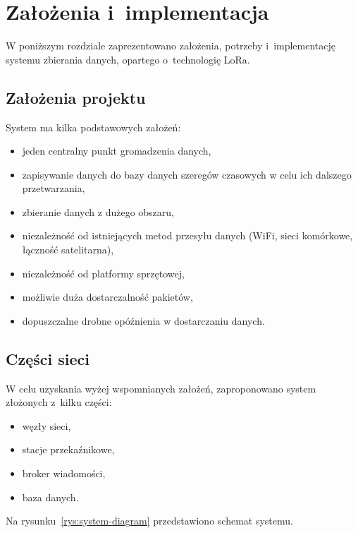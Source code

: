 \chapter{Założenia i~implementacja}
W poniższym rozdziale zaprezentowano założenia, potrzeby i~implementację systemu zbierania danych, opartego o~technologię LoRa.

\section{Założenia projektu}
System ma kilka podstawowych założeń:
\begin{itemize}
    \item jeden centralny punkt gromadzenia danych,
    \item zapisywanie danych do bazy danych szeregów czasowych w celu ich dalszego przetwarzania,
    \item zbieranie danych z dużego obszaru,
    \item niezależność od istniejących metod przesyłu danych (WiFi, sieci komórkowe, łączność satelitarna),
    \item niezależność od platformy sprzętowej,
    \item możliwie duża dostarczalność pakietów,
    \item dopuszczalne drobne opóźnienia w dostarczaniu danych.
\end{itemize}

\section{Części sieci}
W celu uzyskania wyżej wspomnianych założeń, zaproponowano system złożonych z~kilku części:
\begin{itemize}
    \item węzły sieci,
    \item stacje przekaźnikowe,
    \item broker wiadomości,
    \item baza danych.
\end{itemize}

Na rysunku~\ref{rys:system-diagram} przedstawiono schemat systemu.

